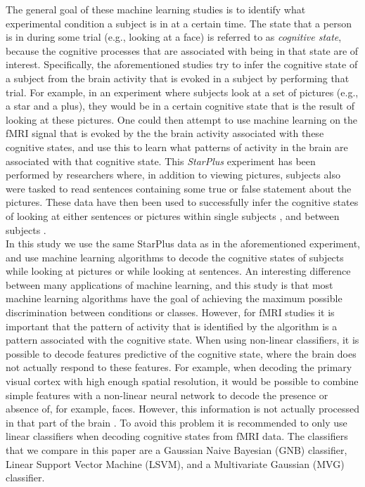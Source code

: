 \documentclass[preprint,journal,11pt]{vgtc}
\begin{document}
\indent The general goal of these machine learning studies is to identify what experimental condition a subject is in at a certain time. The state that a person is in during some trial (e.g., looking at a face) is referred to as \emph{cognitive state}, because the cognitive processes that are associated with being in that state are of interest. Specifically, the aforementioned studies try to infer the cognitive state of a subject from the brain activity that is evoked in a subject by performing that trial. For example, in an experiment where subjects look at a set of pictures (e.g., a star and a plus), they would be in a certain cognitive state that is the result of looking at these pictures. One could then attempt to use machine learning on the fMRI signal that is evoked by the the brain activity associated with these cognitive states, and use this to learn what patterns of activity in the brain are associated with that cognitive state. This \emph{StarPlus} experiment has been performed by researchers where, in addition to viewing pictures, subjects also were tasked to read sentences containing some true or false statement about the pictures. These data have then been used to successfully infer the cognitive states of looking at either sentences or pictures within single subjects \cite{mi:2003within}, and between subjects \cite{wa:2003betw}.\\
\indent In this study we use the same StarPlus data as in the aforementioned experiment, and use machine learning algorithms to decode the cognitive states of subjects while looking at pictures or while looking at sentences. An interesting difference between many applications of machine learning, and this study is that most machine learning algorithms have the goal of achieving the maximum possible discrimination between conditions or classes. However, for fMRI studies it is important that the pattern of activity that is identified by the algorithm is a pattern associated with the cognitive state. When using non-linear classifiers, it is possible to decode features predictive of the cognitive state, where the brain does not actually respond to these features. For example, when decoding the primary visual cortex with high enough spatial resolution, it would be possible to combine simple features with a non-linear neural network to decode the presence or absence of, for example, faces. However, this information is not actually processed in that part of the brain \cite{to:2012rev}. To avoid this problem it is recommended to only use linear classifiers when decoding cognitive states from fMRI data. The classifiers that we compare in this paper are a Gaussian Naive Bayesian (GNB) classifier, Linear Support Vector Machine (LSVM), and a Multivariate Gaussian (MVG) classifier.\\
\end{document}
